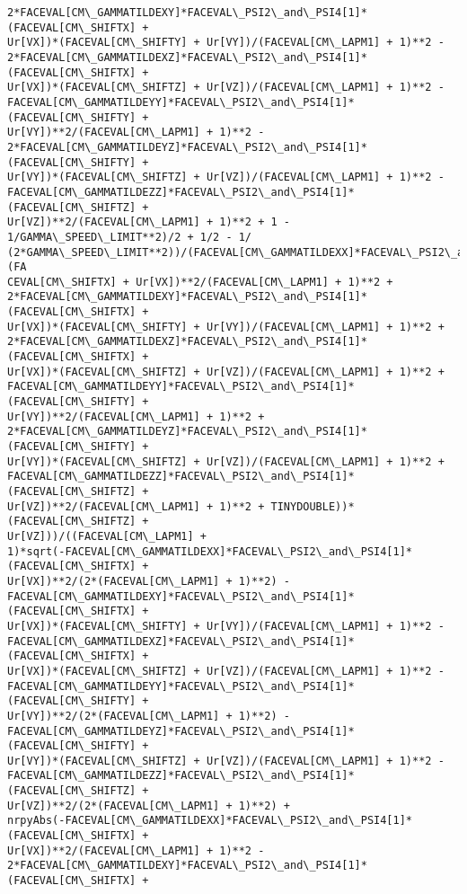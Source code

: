 \documentclass[landscape,letterpaper,10pt,english]{article}
\begin{document}
\begin{Verbatim}[commandchars=\\\{\}]
2*FACEVAL[CM\_GAMMATILDEXY]*FACEVAL\_PSI2\_and\_PSI4[1]*(FACEVAL[CM\_SHIFTX] +
Ur[VX])*(FACEVAL[CM\_SHIFTY] + Ur[VY])/(FACEVAL[CM\_LAPM1] + 1)**2 -
2*FACEVAL[CM\_GAMMATILDEXZ]*FACEVAL\_PSI2\_and\_PSI4[1]*(FACEVAL[CM\_SHIFTX] +
Ur[VX])*(FACEVAL[CM\_SHIFTZ] + Ur[VZ])/(FACEVAL[CM\_LAPM1] + 1)**2 -
FACEVAL[CM\_GAMMATILDEYY]*FACEVAL\_PSI2\_and\_PSI4[1]*(FACEVAL[CM\_SHIFTY] +
Ur[VY])**2/(FACEVAL[CM\_LAPM1] + 1)**2 -
2*FACEVAL[CM\_GAMMATILDEYZ]*FACEVAL\_PSI2\_and\_PSI4[1]*(FACEVAL[CM\_SHIFTY] +
Ur[VY])*(FACEVAL[CM\_SHIFTZ] + Ur[VZ])/(FACEVAL[CM\_LAPM1] + 1)**2 -
FACEVAL[CM\_GAMMATILDEZZ]*FACEVAL\_PSI2\_and\_PSI4[1]*(FACEVAL[CM\_SHIFTZ] +
Ur[VZ])**2/(FACEVAL[CM\_LAPM1] + 1)**2 + 1 - 1/GAMMA\_SPEED\_LIMIT**2)/2 + 1/2 - 1/
(2*GAMMA\_SPEED\_LIMIT**2))/(FACEVAL[CM\_GAMMATILDEXX]*FACEVAL\_PSI2\_and\_PSI4[1]*(FA
CEVAL[CM\_SHIFTX] + Ur[VX])**2/(FACEVAL[CM\_LAPM1] + 1)**2 +
2*FACEVAL[CM\_GAMMATILDEXY]*FACEVAL\_PSI2\_and\_PSI4[1]*(FACEVAL[CM\_SHIFTX] +
Ur[VX])*(FACEVAL[CM\_SHIFTY] + Ur[VY])/(FACEVAL[CM\_LAPM1] + 1)**2 +
2*FACEVAL[CM\_GAMMATILDEXZ]*FACEVAL\_PSI2\_and\_PSI4[1]*(FACEVAL[CM\_SHIFTX] +
Ur[VX])*(FACEVAL[CM\_SHIFTZ] + Ur[VZ])/(FACEVAL[CM\_LAPM1] + 1)**2 +
FACEVAL[CM\_GAMMATILDEYY]*FACEVAL\_PSI2\_and\_PSI4[1]*(FACEVAL[CM\_SHIFTY] +
Ur[VY])**2/(FACEVAL[CM\_LAPM1] + 1)**2 +
2*FACEVAL[CM\_GAMMATILDEYZ]*FACEVAL\_PSI2\_and\_PSI4[1]*(FACEVAL[CM\_SHIFTY] +
Ur[VY])*(FACEVAL[CM\_SHIFTZ] + Ur[VZ])/(FACEVAL[CM\_LAPM1] + 1)**2 +
FACEVAL[CM\_GAMMATILDEZZ]*FACEVAL\_PSI2\_and\_PSI4[1]*(FACEVAL[CM\_SHIFTZ] +
Ur[VZ])**2/(FACEVAL[CM\_LAPM1] + 1)**2 + TINYDOUBLE))*(FACEVAL[CM\_SHIFTZ] +
Ur[VZ]))/((FACEVAL[CM\_LAPM1] +
1)*sqrt(-FACEVAL[CM\_GAMMATILDEXX]*FACEVAL\_PSI2\_and\_PSI4[1]*(FACEVAL[CM\_SHIFTX] +
Ur[VX])**2/(2*(FACEVAL[CM\_LAPM1] + 1)**2) -
FACEVAL[CM\_GAMMATILDEXY]*FACEVAL\_PSI2\_and\_PSI4[1]*(FACEVAL[CM\_SHIFTX] +
Ur[VX])*(FACEVAL[CM\_SHIFTY] + Ur[VY])/(FACEVAL[CM\_LAPM1] + 1)**2 -
FACEVAL[CM\_GAMMATILDEXZ]*FACEVAL\_PSI2\_and\_PSI4[1]*(FACEVAL[CM\_SHIFTX] +
Ur[VX])*(FACEVAL[CM\_SHIFTZ] + Ur[VZ])/(FACEVAL[CM\_LAPM1] + 1)**2 -
FACEVAL[CM\_GAMMATILDEYY]*FACEVAL\_PSI2\_and\_PSI4[1]*(FACEVAL[CM\_SHIFTY] +
Ur[VY])**2/(2*(FACEVAL[CM\_LAPM1] + 1)**2) -
FACEVAL[CM\_GAMMATILDEYZ]*FACEVAL\_PSI2\_and\_PSI4[1]*(FACEVAL[CM\_SHIFTY] +
Ur[VY])*(FACEVAL[CM\_SHIFTZ] + Ur[VZ])/(FACEVAL[CM\_LAPM1] + 1)**2 -
FACEVAL[CM\_GAMMATILDEZZ]*FACEVAL\_PSI2\_and\_PSI4[1]*(FACEVAL[CM\_SHIFTZ] +
Ur[VZ])**2/(2*(FACEVAL[CM\_LAPM1] + 1)**2) +
nrpyAbs(-FACEVAL[CM\_GAMMATILDEXX]*FACEVAL\_PSI2\_and\_PSI4[1]*(FACEVAL[CM\_SHIFTX] +
Ur[VX])**2/(FACEVAL[CM\_LAPM1] + 1)**2 -
2*FACEVAL[CM\_GAMMATILDEXY]*FACEVAL\_PSI2\_and\_PSI4[1]*(FACEVAL[CM\_SHIFTX] +

\end{Verbatim}
\end{document}
